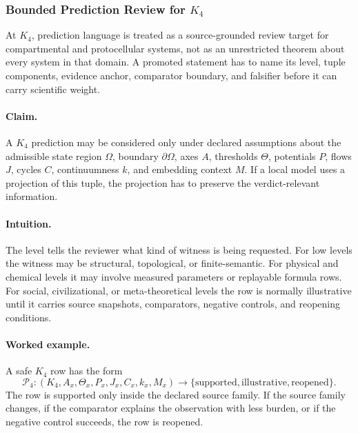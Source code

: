 \subsubsection{Bounded Prediction Review for \texorpdfstring{$K_4$}{K_4}}
\label{sec:predictions-k4-r014}

At \(K_4\), prediction language is treated as a source-grounded review
target for compartmental and protocellular systems, not as an unrestricted theorem about every system in that
domain. A promoted statement has to name its level, tuple components, evidence
anchor, comparator boundary, and falsifier before it can carry scientific
weight.

\paragraph{Claim.}
A \(K_4\) prediction may be considered only under declared assumptions
about the admissible state region \(\Omega\), boundary \(\partial\Omega\), axes
\(A\), thresholds \(\Theta\), potentials \(P\), flows \(J\), cycles \(C\),
continuumness \(k\), and embedding context \(M\). If a local model uses a
projection of this tuple, the projection has to preserve the verdict-relevant
information.

\paragraph{Intuition.}
The level tells the reviewer what kind of witness is being requested. For low
levels the witness may be structural, topological, or finite-semantic. For
physical and chemical levels it may involve measured parameters or replayable
formula rows. For social, civilizational, or meta-theoretical levels the row is
normally illustrative until it carries source snapshots, comparators, negative
controls, and reopening conditions.

\paragraph{Worked example.}
A safe \(K_4\) row has the form
\[
  \mathcal{P}_{4}:
  (K_4, A_x, \Theta_x, P_x, J_x, C_x, k_x, M_x)
  \longrightarrow
  \{\mathrm{supported},\mathrm{illustrative},\mathrm{reopened}\}.
\]
The row is supported only inside the declared source family. If the source
family changes, if the comparator explains the observation with less burden, or
if the negative control succeeds, the row is reopened.

